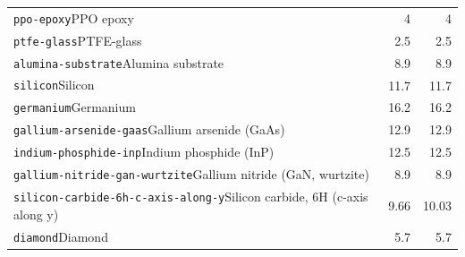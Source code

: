 \begin{longtable}{@{}p{.69\linewidth}rr@{}}
\texttt{ppo-epoxy}\newline PPO epoxy & 4 & 4\\[2pt]
\texttt{ptfe-glass}\newline PTFE-glass & 2.5 & 2.5\\[2pt]
\texttt{alumina-substrate}\newline Alumina substrate & 8.9 & 8.9\\[2pt]
\texttt{silicon}\newline Silicon & 11.7 & 11.7\\[2pt]
\texttt{germanium}\newline Germanium & 16.2 & 16.2\\[2pt]
\texttt{gallium-arsenide-gaas}\newline Gallium arsenide (GaAs) & 12.9 & 12.9\\[2pt]
\texttt{indium-phosphide-inp}\newline Indium phosphide (InP) & 12.5 & 12.5\\[2pt]
\texttt{gallium-nitride-gan-wurtzite}\newline Gallium nitride (GaN, wurtzite) & 8.9 & 8.9\\[2pt]
\texttt{silicon-carbide-6h-c-axis-along-y}\newline Silicon carbide, 6H (c-axis along y) & 9.66 & 10.03\\[2pt]
\texttt{diamond}\newline Diamond & 5.7 & 5.7\\[2pt]
\end{longtable}
